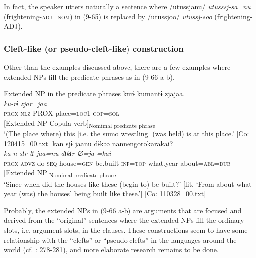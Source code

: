 In fact, the speaker utters naturally a sentence where /utussjanu/ \textit{utusssj-sa=nu} (frightening-\textsc{adj}=\textsc{nom}) in (9-65) is replaced by /utussjoo/ \textit{utussj-soo} (frightening-ADJ).

\subsubsection{Cleft-like (or pseudo-cleft-like) construction}\label{sec:9.3.3.2}

Other than the examples discussed above, there are a few examples where extended NPs fill the predicate phrases as in (9-66 a-b).

\ea   Extended NP in the predicate phrases \label{ex:9.66}
\ea %
 \gllll  kurɨ  kumantɨ  zjajaa.\\
      \textit{ku-rɨ}  \textit{}  \textit{zjar=jaa}\\
      \textsc{prox}-\textsc{nlz}  PROX-place=\textsc{loc}1  \textsc{cop}=\textsc{sol}\\
       {} {[Extended NP}  {Copula verb]\textsubscript{Nomimal predicate phrase}}\\
      \glt       ‘(The place where) this [i.e. the sumo wrestling] (was held) is at this place.’ [Co: 120415\_00.txt]
\ex %
  \glll kan  sjɨ  jaanu  dɨkəə    {\textbar}nannengoro{\textbar}karakai?\\
      \textit{ka-n}  \textit{sɨr-tɨ}  \textit{jaa=nu}  \textit{dɨkɨr-∅=ja} \textit{=kai}\\                                                                           
      \textsc{prox}-\textsc{advz}  do-\textsc{seq}  house=\textsc{gen}  be.built-\textsc{inf}=\textsc{top}  what.year-about=\textsc{abl}=\textsc{dub}\\
         {}     {}         {}             {}    {[Extended NP]\textsubscript{Nomimal predicate phrase}}\\
      \glt ‘Since when did the houses like these (begin to) be built?’ [lit. ‘From about what year (was) the houses’ being built like these.’]   [Co: 110328\_00.txt]
    \z
\z

Probably, the extended NPs in (9-66 a-b) are arguments that are focused and derived from the “original” sentences where the extended NPs fill the ordinary slots, i.e. argument slots, in the clauses. These constructions seem to have some relationship with the “clefts” or “pseudo-clefts” in the languages around the world (cf. \citealt{Payne1997}: 278-281), and more elaborate research remains to be done.

